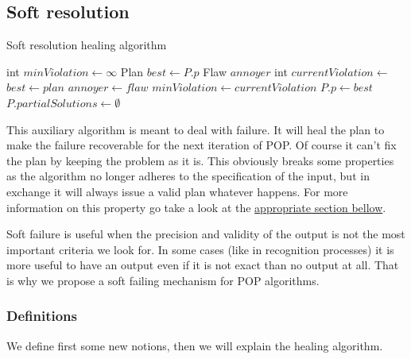 \documentclass[]{article}
\begin{document}
\subsection{Soft resolution}\label{soft-resolution}

\begin{algorithm}\caption{Soft resolution healing algorithm}\label{softresolution}\begin{algorithmic}

 \State int \(minViolation \gets \infty\)
\State Plan \(best \gets P.p\) \State Flaw \(annoyer\)
 \State int
\(currentViolation \gets\) 
 \State \(best \gets plan\)
\State \(annoyer \gets flaw\)
\State \(minViolation \gets currentViolation\) \EndIf
    \EndFor
    \State \(P.p \gets best\)
\State \(P.partialSolutions \gets \emptyset\)
\State {} \EndFor
\EndFunction

\end{algorithmic}\end{algorithm}

This auxiliary algorithm is meant to deal with failure. It will heal the
plan to make the failure recoverable for the next iteration of POP. Of
course it can't fix the plan by keeping the problem as it is. This
obviously breaks some properties as the algorithm no longer adheres to
the specification of the input, but in exchange it will always issue a
valid plan whatever happens. For more information on this property go
take a look at the \hyperref[hypersoundness]{appropriate section
bellow}.

Soft failure is useful when the precision and validity of the output is
not the most important criteria we look for. In some cases (like in
recognition processes) it is more useful to have an output even if it is
not exact than no output at all. That is why we propose a soft failing
mechanism for POP algorithms.

\subsubsection{Definitions}\label{definitions-1}

We define first some new notions, then we will explain the healing
algorithm.
\end{document}
